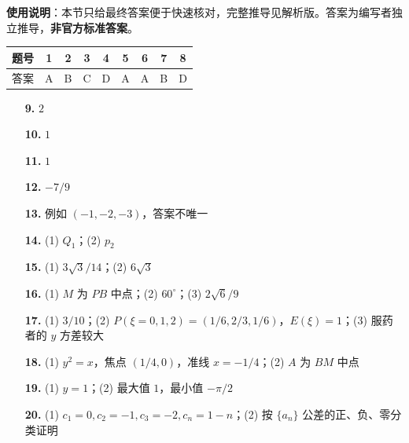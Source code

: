 
\begin{gknotice}
\textbf{使用说明}：本节只给最终答案便于快速核对，完整推导见解析版。答案为编写者独立推导，\textbf{非官方标准答案}。
\end{gknotice}

\begin{center}\begin{tabular}{ccccccccc}
\toprule
题号 & 1 & 2 & 3 & 4 & 5 & 6 & 7 & 8 \\
\midrule
答案 & A & B & C & D & A & A & B & D \\
\bottomrule
\end{tabular}\end{center}

\begin{itemize}[leftmargin=2.6em]
  \item[\textbf{9.}] $2$
  \item[\textbf{10.}] $1$
  \item[\textbf{11.}] $1$
  \item[\textbf{12.}] $-7/9$
  \item[\textbf{13.}] 例如 $(-1,-2,-3)$，答案不唯一
  \item[\textbf{14.}] (1) $Q_1$；(2) $p_2$
\end{itemize}

\begin{itemize}[leftmargin=2.6em]
  \item[\textbf{15.}] (1) $3\sqrt3/14$；(2) $6\sqrt3$
  \item[\textbf{16.}] (1) $M$ 为 $PB$ 中点；(2) $60^\circ$；(3) $2\sqrt6/9$
  \item[\textbf{17.}] (1) $3/10$；(2) $P(\xi=0,1,2)=(1/6,2/3,1/6)$，$E(\xi)=1$；(3) 服药者的 $y$ 方差较大
  \item[\textbf{18.}] (1) $y^2=x$，焦点 $(1/4,0)$，准线 $x=-1/4$；(2) $A$ 为 $BM$ 中点
  \item[\textbf{19.}] (1) $y=1$；(2) 最大值 $1$，最小值 $-\pi/2$
  \item[\textbf{20.}] (1) $c_1=0,c_2=-1,c_3=-2,c_n=1-n$；(2) 按 $\{a_n\}$ 公差的正、负、零分类证明
\end{itemize}
